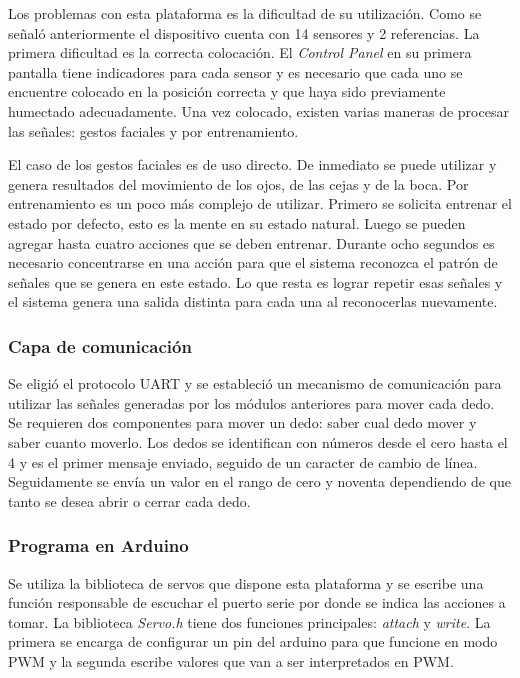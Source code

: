 \documentclass[letterpaper,journal,transmag]{IEEEtran}
\begin{document}
Los problemas con esta plataforma es la dificultad de su utilización. Como se
señaló anteriormente el dispositivo cuenta con 14 sensores y 2 referencias. La
primera dificultad es la correcta colocación. El \emph{Control Panel} en su
primera pantalla tiene indicadores para cada sensor y es necesario que cada uno
se encuentre colocado en la posición correcta y que haya sido previamente
humectado adecuadamente. Una vez colocado, existen varias maneras de procesar
las señales: gestos faciales y por entrenamiento.

El caso de los gestos faciales es de uso directo. De inmediato se puede
utilizar y genera resultados del movimiento de los ojos, de las
cejas y de la boca. Por entrenamiento es un poco más complejo de utilizar.
Primero se solicita entrenar el estado por defecto, esto es la mente en su
estado natural. Luego se pueden agregar hasta cuatro acciones que se deben
entrenar. Durante ocho segundos es necesario concentrarse en una acción para
que el sistema reconozca el patrón de señales que se genera en este estado. Lo
que resta es lograr repetir esas señales y el sistema genera una salida
distinta para cada una al reconocerlas nuevamente.\\

\subsubsection{Capa de comunicación}
Se eligió el protocolo UART y se estableció un mecanismo de comunicación para
utilizar las señales generadas por los módulos anteriores para mover cada dedo.
Se requieren dos componentes para mover un dedo: saber cual dedo mover y saber
cuanto moverlo. Los dedos se identifican con números desde el cero hasta el 4 y
es el primer mensaje enviado, seguido de un caracter de cambio de línea.
Seguidamente se envía un valor en el rango de cero y noventa dependiendo de que
tanto se desea abrir o cerrar cada dedo.\\

\subsubsection{Programa en Arduino}
Se utiliza la biblioteca de servos que dispone esta plataforma y se escribe una
función responsable de escuchar el puerto serie por donde se indica las
acciones a tomar. La biblioteca \emph{Servo.h} tiene dos funciones principales:
\emph{attach} y \emph{write}. La primera se encarga de configurar un pin del
arduino para que funcione en modo PWM y la segunda escribe valores que van a
ser interpretados en PWM.\\
\end{document}
